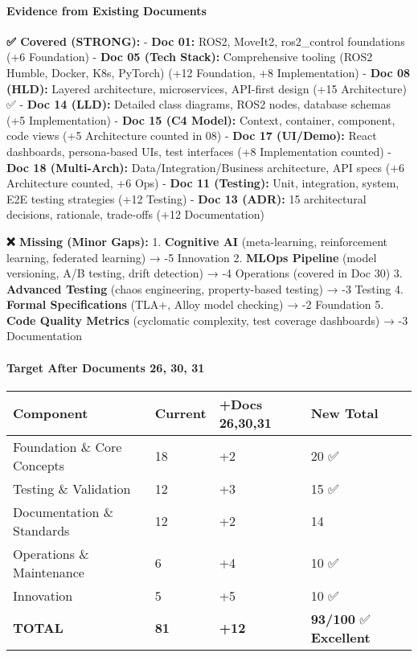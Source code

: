\documentclass[
]{article}
\begin{document}
\hypertarget{evidence-from-existing-documents-2}{%
\paragraph{Evidence from Existing
Documents}\label{evidence-from-existing-documents-2}}

\textbf{✅ Covered (STRONG):} - \textbf{Doc 01:} ROS2, MoveIt2,
ros2\_control foundations (+6 Foundation) - \textbf{Doc 05 (Tech
Stack):} Comprehensive tooling (ROS2 Humble, Docker, K8s, PyTorch) (+12
Foundation, +8 Implementation) - \textbf{Doc 08 (HLD):} Layered
architecture, microservices, API-first design (+15 Architecture) ✅ -
\textbf{Doc 14 (LLD):} Detailed class diagrams, ROS2 nodes, database
schemas (+5 Implementation) - \textbf{Doc 15 (C4 Model):} Context,
container, component, code views (+5 Architecture counted in 08) -
\textbf{Doc 17 (UI/Demo):} React dashboards, persona-based UIs, test
interfaces (+8 Implementation counted) - \textbf{Doc 18 (Multi-Arch):}
Data/Integration/Business architecture, API specs (+6 Architecture
counted, +6 Ops) - \textbf{Doc 11 (Testing):} Unit, integration, system,
E2E testing strategies (+12 Testing) - \textbf{Doc 13 (ADR):} 15
architectural decisions, rationale, trade-offs (+12 Documentation)

\textbf{❌ Missing (Minor Gaps):} 1. \textbf{Cognitive AI}
(meta-learning, reinforcement learning, federated learning) → -5
Innovation 2. \textbf{MLOps Pipeline} (model versioning, A/B testing,
drift detection) → -4 Operations (covered in Doc 30) 3. \textbf{Advanced
Testing} (chaos engineering, property-based testing) → -3 Testing 4.
\textbf{Formal Specifications} (TLA+, Alloy model checking) → -2
Foundation 5. \textbf{Code Quality Metrics} (cyclomatic complexity, test
coverage dashboards) → -3 Documentation

\hypertarget{target-after-documents-26-30-31}{%
\paragraph{Target After Documents 26, 30,
31}\label{target-after-documents-26-30-31}}

\begin{longtable}[]{@{}llll@{}}
\toprule\noalign{}
Component & Current & +Docs 26,30,31 & New Total \\
\midrule\noalign{}
\endhead
\bottomrule\noalign{}
\endlastfoot
Foundation \& Core Concepts & 18 & +2 & 20 ✅ \\
Testing \& Validation & 12 & +3 & 15 ✅ \\
Documentation \& Standards & 12 & +2 & 14 \\
Operations \& Maintenance & 6 & +4 & 10 ✅ \\
Innovation & 5 & +5 & 10 ✅ \\
\textbf{TOTAL} & \textbf{81} & \textbf{+12} & \textbf{93/100} ✅
\textbf{Excellent} \\
\end{longtable}
\end{document}
